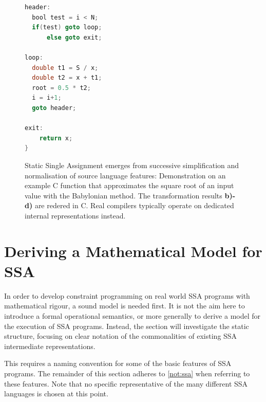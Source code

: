 \begin{figure}[p]
\begin{minipage}{0.48\textwidth}
\begin{lstlisting}[language=C,basicstyle=\linespread{1.06451612903}\ttfamily]
header:
  bool test = i < N;
  if(test) goto loop;
      else goto exit;

loop:
  double t1 = S / x;
  double t2 = x + t1;
  root = 0.5 * t2;
  i = i+1;
  goto header;

exit:
    return x;
}
    \end{lstlisting}
\end{minipage}

    \caption{Static Single Assignment emerges from successive simplification
             and normalisation of source language features: 
             Demonstration on an example C function that approximates the
             square root of an input value with the Babylonian method.
             The transformation results {\bf b)-d)} are redered in C.
             Real compilers typically operate on
             dedicated internal representations instead.}
    \label{ssaexample}
\end{figure}

\newpage
\section{Deriving a Mathematical Model for SSA}

    In order to develop constraint programming on real world SSA programs with
    mathematical rigour, a sound model is needed first.
    It is not the aim here to introduce a formal operational semantics, or more
    generally to derive a model for the execution of SSA programs.
    Instead, the section will investigate the static structure, focusing on
    clear notation of the commonalities of existing SSA intermediate
    representations.

    This requires a naming convention for some of the basic features of
    SSA programs.
    The remainder of this section adheres to \autoref{not:ssa} when referring to
    these features.
    Note that no specific representative of the many different SSA languages is
    chosen at this point.

